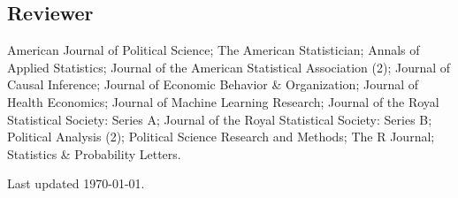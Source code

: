 \documentclass[10pt,letterpaper]{article}
\newenvironment{infolist}{
	\begin{list}{}{
		\setlength{\parskip}{0pt}
		\setlength{\itemsep}{4pt}
		\setlength{\parsep}{0.3em}
		\setlength{\leftmargin}{0em}
		\setlength{\labelwidth}{0em}
		}
	}{
\end{list}
}
\newcommand{\infoitem}[1]{\item {#1}}
\begin{document}
	\subsection*{Reviewer}

	\begin{infolist}
		\infoitem{American Journal of Political Science; The American Statistician; Annals of Applied Statistics; Journal of the American Statistical Association (2); Journal of Causal Inference; Journal of Economic Behavior \& Organization; Journal of Health Economics; Journal of Machine Learning Research; Journal of the Royal Statistical Society: Series A; Journal of the Royal Statistical Society: Series B; Political Analysis (2); Political Science Research and Methods; The R Journal; Statistics \& Probability Letters.}
	\end{infolist}

	\bigskip
	{\small Last updated \today.}
\end{document}
